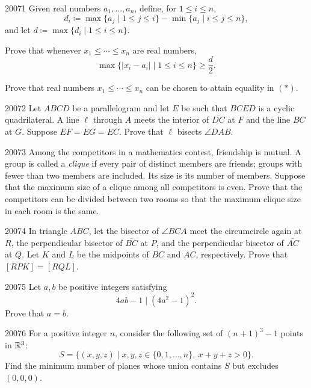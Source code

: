 
\begin{problem}{2007}{1}
Given real numbers $a_1, \dots, a_n$, define, for $1\leq i\leq n$,
\[
    d_i\coloneqq\max\{a_j\mid1\leq j\leq i\}-\min\{a_j\mid i\leq j\leq n\},
\]
and let $d\coloneqq\max\{d_i\mid1\leq i\leq n\}$.
\begin{problemsubparts}
    \item Prove that whenever $x_1\leq\cdots\leq x_n$ are real numbers,
    \[
        \max\{|x_i-a_i|\mid1\leq i\leq n\}\geq\frac d2.\tag{*}
    \]
    \item Prove that real numbers $x_1\leq\cdots\leq x_n$ can be chosen to attain equality in $(*)$.
\end{problemsubparts}
\end{problem}

\begin{problem}{2007}{2}
Let $ABCD$ be a parallelogram and let $E$ be such that $BCED$ is a cyclic quadrilateral. A line $\ell$ through $A$ meets the interior of $\overline{DC}$ at $F$ and the line $BC$ at $G$. Suppose $EF=EG=EC$. Prove that $\ell$ bisects $\angle DAB$.
\end{problem}

\begin{problem}{2007}{3}
Among the competitors in a mathematics contest, friendship is mutual. A group is called a \emph{clique} if every pair of distinct members are friends; groups with fewer than two members are included. Its size is its number of members. Suppose that the maximum size of a clique among all competitors is even. Prove that the competitors can be divided between two rooms so that the maximum clique size in each room is the same.
\end{problem}

\begin{problem}{2007}{4}
In triangle $ABC$, let the bisector of $\angle BCA$ meet the circumcircle again at $R$, the perpendicular bisector of $\overline{BC}$ at $P$, and the perpendicular bisector of $\overline{AC}$ at $Q$. Let $K$ and $L$ be the midpoints of $BC$ and $AC$, respectively. Prove that $[RPK]=[RQL]$.
\end{problem}

\begin{problem}{2007}{5}
Let $a, b$ be positive integers satisfying
\[
    4ab-1\mid(4a^2-1)^2.
\]
Prove that $a=b$.
\end{problem}

\begin{problem}{2007}{6}
For a positive integer $n$, consider the following set of $(n+1)^3-1$ points in $\mathbb{R}^3$:
\[
    S=\{(x, y, z)\mid x, y, z\in\{0, 1, \dots, n\},\ x+y+z>0\}.
\]
Find the minimum number of planes whose union contains $S$ but excludes $(0, 0, 0)$.
\end{problem}
